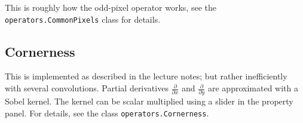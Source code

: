 \documentclass{article}
\begin{document}
This is roughly how the odd-pixel operator works, see the \texttt{operators.CommonPixels}
class for details.

\subsection{Cornerness}

This is implemented as described in the lecture notes; but rather inefficiently
with several convolutions. Partial derivatives $\frac{\partial}{\partial x}$ and
$\frac{\partial}{\partial y}$ are approximated with a Sobel kernel.
The kernel can be scalar multiplied using a slider in the property panel.
For details, see the class \texttt{operators.Cornerness}.
\end{document}
